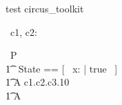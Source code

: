 \begin{zsection}
   \SECTION test \parents circus\_toolkit
\end{zsection}

\begin{circus}
   \circchannel\ c1, c2: \boolean
\end{circus}

\begin{circus}
    \circprocess\ P \circdef \circbegin \\
    	\t1 \circstate\ State == [~ x: \nat | true ~] \\
        \t1 A \circdef c1.\true \then c2.\false \then c3.10 \then \Skip \\
        \t1 \circspot A \\
    \circend
\end{circus}

